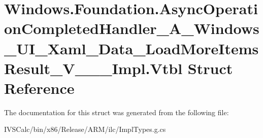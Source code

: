 \hypertarget{struct_windows_1_1_foundation_1_1_async_operation_completed_handler___a___windows___u_i___xaml__353f38b417799f6d506ea90719de01fa}{}\section{Windows.\+Foundation.\+Async\+Operation\+Completed\+Handler\+\_\+\+A\+\_\+\+Windows\+\_\+\+U\+I\+\_\+\+Xaml\+\_\+\+Data\+\_\+\+Load\+More\+Items\+Result\+\_\+\+V\+\_\+\+\_\+\+\_\+\+Impl.\+Vtbl Struct Reference}
\label{struct_windows_1_1_foundation_1_1_async_operation_completed_handler___a___windows___u_i___xaml__353f38b417799f6d506ea90719de01fa}


The documentation for this struct was generated from the following file\+:\begin{DoxyCompactItemize}
\item 
I\+V\+S\+Calc/bin/x86/\+Release/\+A\+R\+M/ilc/Impl\+Types.\+g.\+cs\end{DoxyCompactItemize}
